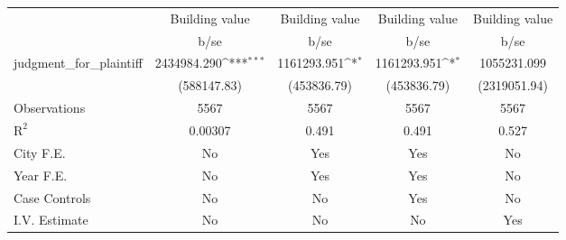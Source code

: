 {
\def\sym#1{\ifmmode^{#1}\else\(^{#1}\)\fi}
\begin{tabular}{l*{4}{c}}
\toprule
                    &\multicolumn{1}{c}{\hspace{0.25cm}Building value}&\multicolumn{1}{c}{\hspace{0.25cm}Building value}&\multicolumn{1}{c}{\hspace{0.25cm}Building value}&\multicolumn{1}{c}{\hspace{0.25cm}Building value}\\
                    &        b/se         &        b/se         &        b/se         &        b/se         \\
\midrule
judgment\_for\_plaintiff& 2434984.290\sym{***}& 1161293.951\sym{*}  & 1161293.951\sym{*}  & 1055231.099         \\
                    & (588147.83)         & (453836.79)         & (453836.79)         &(2319051.94)         \\
\midrule
Observations        &        5567         &        5567         &        5567         &        5567         \\
$\text{R}^2$        &     0.00307         &       0.491         &       0.491         &       0.527         \\
City F.E.           &          No         &         Yes         &         Yes         &          No         \\
Year F.E.           &          No         &         Yes         &         Yes         &          No         \\
Case Controls       &          No         &          No         &         Yes         &          No         \\
I.V. Estimate       &          No         &          No         &          No         &         Yes         \\
\bottomrule
\end{tabular}
}
